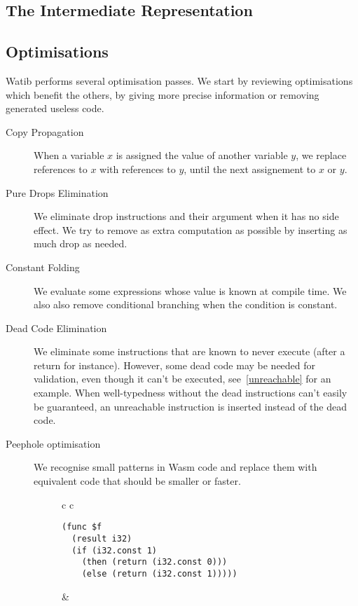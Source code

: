 \documentclass[10pt]{article}
\begin{document}
\subsection{The Intermediate Representation}\label{ir}
\subsection{Optimisations}
Watib performs several optimisation passes. We start by reviewing optimisations
which benefit the others, by giving more precise information or removing
generated useless code.
\begin{description}
  \item[Copy Propagation] When a variable $x$ is assigned the value of another
    variable $y$, we replace references to $x$ with references to $y$, until the
    next assignement to $x$ or $y$.
  \item[Pure Drops Elimination] We eliminate \textsf{drop} instructions and
    their argument when it has no side effect. We try to remove as extra
    computation as possible by inserting as much \textsf{drop} as needed.
  \item[Constant Folding] We evaluate some expressions whose value is known at
    compile time. We also also remove conditional branching when the condition
    is constant.
  \item[Dead Code Elimination] We eliminate some instructions that are
    known to never execute (after a \textsf{return} for instance). However, some
    dead code may be needed for validation, even though it can't be
    executed, see~\ref{unreachable} for an example. When well-typedness without
    the dead instructions can't easily be guaranteed, an
    \textsf{unreachable} instruction is inserted instead of the dead code.
  \item[Peephole optimisation] We recognise small patterns in Wasm code and
    replace them with equivalent code that should be smaller or faster.
\begin{figure}[h]
\centering
\begin{tabular}{c c}
\begin{minipage}{2.8in}
\begin{verbatim}
(func $f
  (result i32)
  (if (i32.const 1)
    (then (return (i32.const 0)))
    (else (return (i32.const 1)))))
\end{verbatim}
\end{minipage}
&\begin{minipage}{2.8in}
\begin{verbatim}

\end{verbatim}
\end{minipage}
\end{tabular}
\end{figure}
\end{description}
\end{document}
